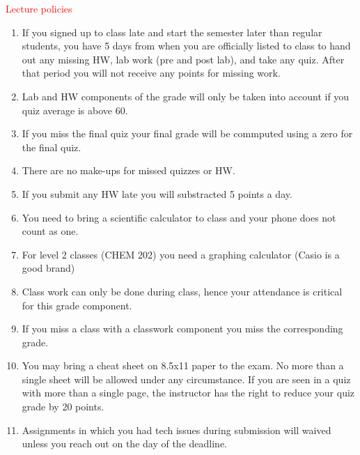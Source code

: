 \documentclass[cover.tex]{subfiles}
\begin{document}
 


\begin{mdframed}[style=MyFrame]
\begin{center}{\textcolor{red}{\Large Lecture policies}}\end{center}
\begin{enumerate}
\item If you signed up to class late and start the semester later than regular students, you have 5 days from when you are officially listed to class to hand out any missing HW, lab work (pre and post lab), and take any quiz. After that period you will not receive any points for missing work.
\item Lab and HW components of the grade will only be taken into account if you quiz average is above 60.
\item If you miss the final quiz your final grade will be commputed using a zero for the final quiz.
\item There are no make-ups for missed quizzes or HW.
\item If you submit any HW late you will substracted 5 points a day.
\item You need to bring a scientific calculator to class and your phone does not count as one.
\item For level 2 classes (CHEM 202) you need a graphing calculator (Casio is a good brand)
\item Class work can only be done during class, hence your attendance is critical for this grade component.
\item If you miss a class with a classwork component you miss the corresponding grade.
\item You may bring a cheat sheet on 8.5x11 paper to the exam. No more than a single sheet will be allowed under any circumstance. If you are seen in a quiz with more than a single page, the instructor has the right to reduce your quiz grade by 20 points.
\item Assignments in which you had tech issues during submission will waived unless you reach out on the day of the deadline.
\end{enumerate}
 
    \par\noindent\makebox[1.5in]{\hrulefill}   \hfill\makebox[2.0in]{\hrulefill}    \hfill\makebox[2.0in]{\hrulefill}  \par\noindent{}    \hfill{}   \hfill{} 
 

\end{mdframed}
\end{document}
